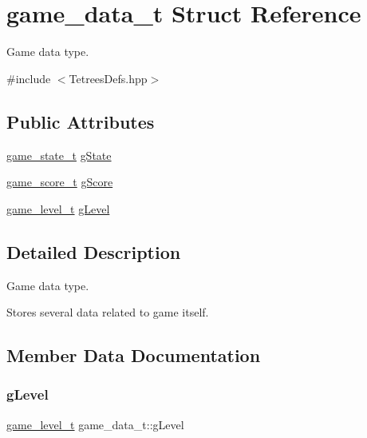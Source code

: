 \hypertarget{structgame__data__t}{}\section{game\+\_\+data\+\_\+t Struct Reference}
\label{structgame__data__t}


Game data type.  




{\ttfamily \#include $<$Tetrees\+Defs.\+hpp$>$}

\subsection*{Public Attributes}
\begin{DoxyCompactItemize}
\item 
\hyperlink{TetreesDefs_8hpp_aebae08b2e3a36f1452b33acaf1eaab40}{game\+\_\+state\+\_\+t} \hyperlink{structgame__data__t_a48253f7b6212e0ff99d5d5960b79476d}{g\+State}
\item 
\hyperlink{structgame__score__t}{game\+\_\+score\+\_\+t} \hyperlink{structgame__data__t_a70e04b66160685cc84bcdd30edb97e46}{g\+Score}
\item 
\hyperlink{structgame__level__t}{game\+\_\+level\+\_\+t} \hyperlink{structgame__data__t_a7918ec335ac715bcf7ec197920afe56b}{g\+Level}
\end{DoxyCompactItemize}


\subsection{Detailed Description}
Game data type. 

Stores several data related to game itself. 

\subsection{Member Data Documentation}
\mbox{\label{structgame__data__t_a7918ec335ac715bcf7ec197920afe56b}} 
\subsubsection{\texorpdfstring{g\+Level}{gLevel}}
{\footnotesize\ttfamily \hyperlink{structgame__level__t}{game\+\_\+level\+\_\+t} game\+\_\+data\+\_\+t\+::g\+Level}

